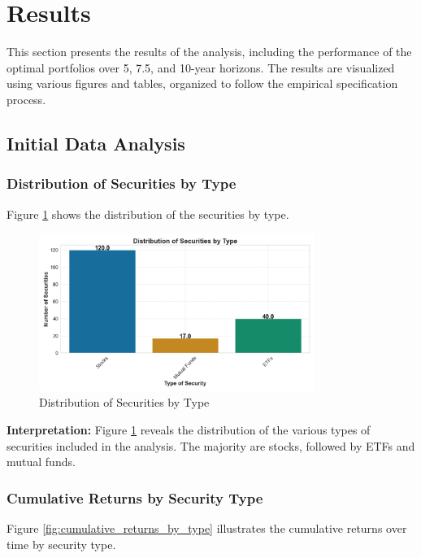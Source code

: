 \section{Results}

This section presents the results of the analysis, including the performance of the optimal portfolios over 5, 7.5, and 10-year horizons. The results are visualized using various figures and tables, organized to follow the empirical specification process.

\subsection{Initial Data Analysis}

\subsubsection{Distribution of Securities by Type}
Figure \ref{fig:distribution_of_securities} shows the distribution of the securities by type.

\begin{figure}[!htbp]
    \centering
    \includegraphics[width=0.8\textwidth]{../Figures/histogram_security_count.png}
    \caption{Distribution of Securities by Type}
    \label{fig:distribution_of_securities}
\end{figure}

\textbf{Interpretation:} Figure \ref{fig:distribution_of_securities} reveals the distribution of the various types of securities included in the analysis. The majority are stocks, followed by ETFs and mutual funds.

\subsubsection{Cumulative Returns by Security Type}
Figure \ref{fig:cumulative_returns_by_type} illustrates the cumulative returns over time by security type.


